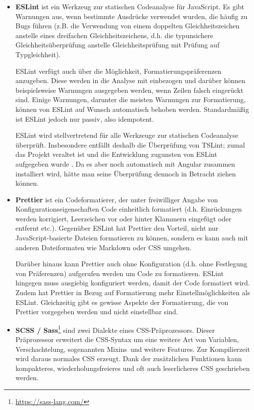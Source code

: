 \begin{itemize}
\item \textbf{ESLint} ist ein Werkzeug zur statischen Codeanalyse für JavaScript. Es gibt Warnungen aus, wenn bestimmte Ausdrücke verwendet wurden, die häufig zu Bugs führen (z.B. die Verwendung von einem doppelten Gleichheitszeichen anstelle eines dreifachen Gleichheitszeichens, d.h. die typunsichere Gleichheitsüberprüfung anstelle Gleichheitsprüfung mit Prüfung auf Typgleichheit).

ESLint verfügt auch über die Möglichkeit, Formatierungspräferenzen anzugeben. Diese werden in die Analyse mit einbezogen und darüber können beispielsweise Warnungen ausgegeben werden, wenn Zeilen falsch eingerückt sind. Einige Warnungen, darunter die meisten Warnungen zur Formatierung, können von ESLint auf Wunsch automatisch behoben werden. Standardmäßig ist ESLint jedoch nur passiv, also idempotent.

ESLint wird stellvertretend für alle Werkzeuge zur statischen Codeanalyse überprüft. Insbesondere entfällt deshalb die Überprüfung von TSLint; zumal das Projekt veraltet ist und die Entwicklung zugunsten von ESLint aufgegeben wurde \cite{tslint_deprecation} \cite{tslint_repo}. Da es aber noch automatisch mit Angular zusammen installiert wird, hätte man seine Überprüfung dennoch in Betracht ziehen können.

\item \textbf{Prettier} ist ein Codeformatierer, der unter freiwilliger Angabe von Konfigurationseigenschaften Code einheitlich formatiert (d.h. Einrückungen werden korrigiert, Leerzeichen vor oder hinter Klammern eingefügt oder entfernt etc.). Gegenüber ESLint hat Prettier den Vorteil, nicht nur JavaScript-basierte Dateien formatieren zu können, sondern es kann auch mit anderen Dateiformaten wie Markdown oder CSS umgehen.

Darüber hinaus kann Prettier auch ohne Konfiguration (d.h. ohne Festlegung von Präferenzen) aufgerufen werden um Code zu formatieren. ESLint hingegen muss ausgiebig konfiguriert werden, damit der Code formatiert wird. Zudem hat Prettier in Bezug auf Formatierung mehr Einstellmöglichkeiten als ESLint. Gleichzeitig gibt es gewisse Aspekte der Formatierung, die von Prettier vorgegeben werden und nicht einstellbar sind.

\item \textbf{SCSS / Sass}\footnote{\url{https://sass-lang.com/}} sind zwei Dialekte eines CSS-Präprozessors. Dieser Präprozessor erweitert die CSS-Syntax um eine weitere Art von Variablen, Verschachtelung, sogenannten \glqq Mixins\grqq\ und weitere Features. Zur Kompilierzeit wird daraus normales CSS erzeugt. Dank der zusätzlichen Funktionen kann kompakteres, wiederholungsfreieres und oft auch leserlicheres CSS geschrieben werden.


\end{itemize}

